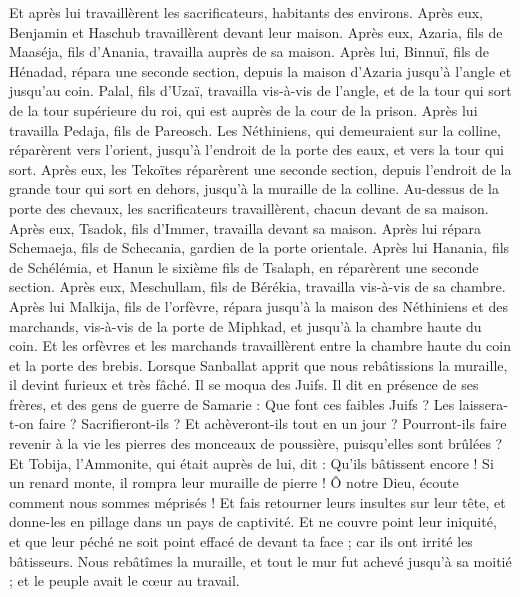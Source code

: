 \begin{multicols}{2}
Et après lui travaillèrent les sacrificateurs, habitants des environs.
Après eux, Benjamin et Haschub travaillèrent devant leur maison. Après eux, Azaria, fils de Maaséja, fils d'Anania, travailla auprès de sa maison.
Après lui, Binnuï, fils de Hénadad, répara une seconde section, depuis la maison d'Azaria jusqu'à l'angle et jusqu'au coin.
Palal, fils d'Uzaï, travailla vis-à-vis de l'angle, et de la tour qui sort de la tour supérieure du roi, qui est auprès de la cour de la prison. Après lui travailla Pedaja, fils de Pareosch.
Les Néthiniens, qui demeuraient sur la colline, réparèrent vers l'orient, jusqu'à l'endroit de la porte des eaux, et vers la tour qui sort.
Après eux, les Tekoïtes réparèrent une seconde section, depuis l'endroit de la grande tour qui sort en dehors, jusqu'à la muraille de la colline.
Au-dessus de la porte des chevaux, les sacrificateurs travaillèrent, chacun devant de sa maison.
Après eux, Tsadok, fils d'Immer, travailla devant sa maison. Après lui répara Schemaeja, fils de Schecania, gardien de la porte orientale.
Après lui Hanania, fils de Schélémia, et Hanun le sixième fils de Tsalaph, en réparèrent une seconde section. Après eux, Meschullam, fils de Bérékia, travailla vis-à-vis de sa chambre.
Après lui Malkija, fils de l'orfèvre, répara jusqu'à la maison des Néthiniens et des marchands, vis-à-vis de la porte de Miphkad, et jusqu'à la chambre haute du coin.
Et les orfèvres et les marchands travaillèrent entre la chambre haute du coin et la porte des brebis.
\VerseOne{}Lorsque Sanballat apprit que nous rebâtissions la muraille, il devint furieux et très fâché. Il se moqua des Juifs.
Il dit en présence de ses frères, et des gens de guerre de Samarie : Que font ces faibles Juifs ? Les laissera-t-on faire ? Sacrifieront-ils ? Et achèveront-ils tout en un jour ? Pourront-ils faire revenir à la vie les pierres des monceaux de poussière, puisqu'elles sont brûlées ?
Et Tobija, l'Ammonite, qui était auprès de lui, dit : Qu'ils bâtissent encore ! Si un renard monte, il rompra leur muraille de pierre !
Ô notre Dieu, écoute comment nous sommes méprisés ! Et fais retourner leurs insultes sur leur tête, et donne-les en pillage dans un pays de captivité.
Et ne couvre point leur iniquité, et que leur péché ne soit point effacé de devant ta face ; car ils ont irrité les bâtisseurs.
Nous rebâtîmes la muraille, et tout le mur fut achevé jusqu'à sa moitié ; et le peuple avait le cœur au travail.

\end{multicols}
